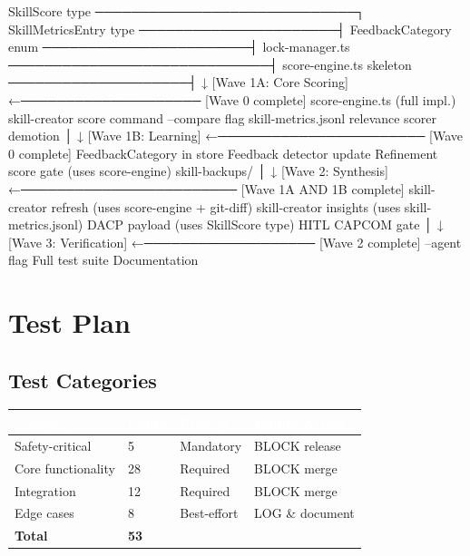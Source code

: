 \documentclass[11pt,letterpaper]{article}
\newcommand{\tableheader}[1]{\textbf{\sffamily\textcolor{white}{#1}}}
\begin{document}
\begin{asciibox}
    SkillScore type ─────────────────────────────┐
    SkillMetricsEntry type ──────────────────────┤
    FeedbackCategory enum ───────────────────────┤
    lock-manager.ts ─────────────────────────────┤
    score-engine.ts skeleton ────────────────────┤
                                                 ↓
  [Wave 1A: Core Scoring] ←──────────────────── [Wave 0 complete]
    score-engine.ts (full impl.)
    skill-creator score command
    --compare flag
    skill-metrics.jsonl
    relevance scorer demotion
         │
         ↓
  [Wave 1B: Learning] ←─────────────────────── [Wave 0 complete]
    FeedbackCategory in store
    Feedback detector update
    Refinement score gate (uses score-engine)
    skill-backups/
         │
         ↓
  [Wave 2: Synthesis] ←──────────────────────── [Wave 1A AND 1B complete]
    skill-creator refresh (uses score-engine + git-diff)
    skill-creator insights (uses skill-metrics.jsonl)
    DACP payload (uses SkillScore type)
    HITL CAPCOM gate
         │
         ↓
  [Wave 3: Verification] ←─────────────────── [Wave 2 complete]
    --agent flag
    Full test suite
    Documentation
\end{asciibox}

\section{Test Plan}

\subsection{Test Categories}

\begin{center}
\begin{tabularx}{\textwidth}{L{3cm}C{1.5cm}C{2cm}L{4cm}}
\toprule
{}
\tableheader{Category} & \tableheader{Count} & \tableheader{Priority} & \tableheader{Failure Action} \\
\midrule
Safety-critical & 5 & Mandatory & BLOCK release \\
Core functionality & 28 & Required & BLOCK merge \\
Integration & 12 & Required & BLOCK merge \\
Edge cases & 8 & Best-effort & LOG \& document \\
\textbf{Total} & \textbf{53} & & \\
\bottomrule
\end{tabularx}
\end{center}
\end{document}
